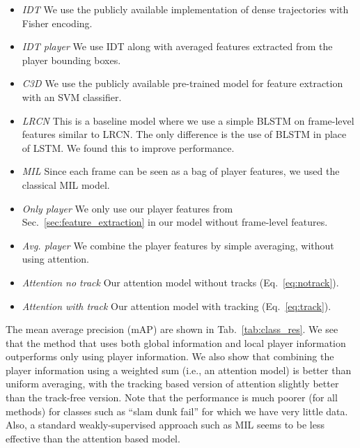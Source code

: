 \begin{itemize}\denselist
  \item \emph{IDT\cite{Wang_CVPR11}} We use the publicly available implementation of dense trajectories with
  Fisher encoding.
  
  \item \emph{IDT\cite{Wang_CVPR11} player} We use IDT along with averaged features extracted from the player
  bounding boxes.

  \item \emph{C3D \cite{Tran_arxiv14}} We use the publicly available pre-trained model for feature extraction
  with an SVM classifier.

  \item \emph{LRCN \cite{Donahue_arxiv14}} This is a baseline model where we use a simple BLSTM on frame-level features similar
  to LRCN. The only difference is the use of BLSTM in place of LSTM. We found this to improve
  performance.

  \item \emph{MIL \cite{Andrews_NIPS02}} Since each frame can be seen as a bag of player features, we used the
  classical MIL model. 

\item \emph{Only player} We only use our player features from Sec.~\ref{sec:feature_extraction} in our model
  without frame-level features.
 
  \item \emph{Avg. player} We combine the player features by simple averaging, without
using  attention.

  \item \emph{Attention no track} Our attention model without tracks (Eq.~\ref{eq:notrack}).

  \item \emph{Attention with track} Our attention model with tracking (Eq.~\ref{eq:track}).
\end{itemize}

The mean average precision (mAP)
are shown in Tab.~\ref{tab:class_res}. We see that the method that
uses both global information and local player information outperforms
only using player information. We also show that combining the player
information using a weighted sum (i.e., an attention model) is better
than uniform averaging, with the tracking based version of attention
slightly better than the track-free version.
Note that the performance is much poorer (for all methods) for classes
such as ``slam dunk fail'' for which we have very little data.
Also, a standard weakly-supervised approach such as MIL seems to be
less effective than the attention based model.

